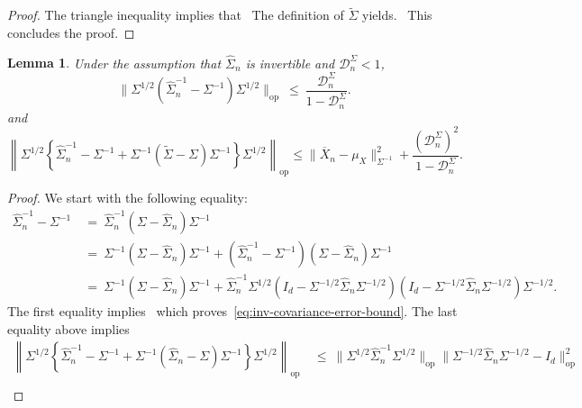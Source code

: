 \documentclass{article}
\newtheorem{lemma}{Lemma}
\begin{document}
\begin{appendices}
 \begin{proof}
 The triangle inequality implies that
 \
 The definition of $\widetilde{\Sigma}$ yields.
 \ 
 This concludes the proof.
 \end{proof}
 \begin{lemma}\label{lemma:linear-expansion-inv-covariance}
 Under the assumption that $\widehat{\Sigma}_n$ is invertible and $\mathcal{D}_n^{\Sigma} <1$,
 \begin{equation}\label{eq:inv-covariance-error-bound}
 \|\Sigma^{1/2}(\widehat{\Sigma}_n^{-1} - \Sigma^{-1})\Sigma^{1/2}\|_{\mathrm{op}} ~\le~ \frac{\mathcal{D}_n^{\Sigma}}{1 - \mathcal{D}_n^{\Sigma}}. 
 \end{equation}
 and
 \begin{equation}\label{eq:final-linear-expansion-inv-covariance}
 \left\|\Sigma^{1/2}\left\{\widehat{\Sigma}_n^{-1} - \Sigma^{-1} + \Sigma^{-1}(\widetilde{\Sigma} - \Sigma)\Sigma^{-1}\right\}\Sigma^{1/2}\right\|_{\mathrm{op}} \le \|\overline{X}_n - \mu_X\|^2_{\Sigma^{-1}} + \frac{(\mathcal{D}_n^{\Sigma})^2}{1 - \mathcal{D}_n^{\Sigma}}.
 \end{equation}
 \end{lemma}
 \begin{proof}
 We start with the following equality:
 \begin{align*}
 \widehat{\Sigma}_n^{-1} - \Sigma^{-1} ~&=~ \widehat{\Sigma}_n^{-1}(\Sigma - \widehat{\Sigma}_n)\Sigma^{-1}\\
 ~&=~ \Sigma^{-1}(\Sigma - \widehat{\Sigma}_n)\Sigma^{-1} + (\widehat{\Sigma}_n^{-1} - \Sigma^{-1})(\Sigma - \widehat{\Sigma}_n)\Sigma^{-1}\\
 ~&=~ \Sigma^{-1}(\Sigma - \widehat{\Sigma}_n)\Sigma^{-1} + \widehat{\Sigma}_n^{-1}\Sigma^{1/2}(I_d - \Sigma^{-1/2}\widehat{\Sigma}_n\Sigma^{-1/2})(I_d - \Sigma^{-1/2}\widehat{\Sigma}_n\Sigma^{-1/2})\Sigma^{-1/2}.
 \end{align*}
 The first equality implies
 \
 which proves~\eqref{eq:inv-covariance-error-bound}. The last equality above implies
 \begin{equation}\label{eq:linear-expansion-partial-corr}
 \begin{split}
 \left\|\Sigma^{1/2}\left\{\widehat{\Sigma}_n^{-1} - \Sigma^{-1} + \Sigma^{-1}(\widehat{\Sigma}_n - \Sigma)\Sigma^{-1}\right\}\Sigma^{1/2}\right\|_{\mathrm{op}} ~&\le~ \|\Sigma^{1/2}\widehat{\Sigma}_n^{-1}\Sigma^{1/2}\|_{\mathrm{op}}\|\Sigma^{-1/2}\widehat{\Sigma}_n\Sigma^{-1/2} - I_d\|_{\mathrm{op}}^2\\
 

\end{split}
\end{equation}
\end{proof}
\end{appendices}
\end{document}
